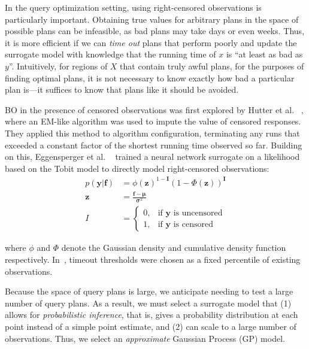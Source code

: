 In the query optimization setting, using right-censored observations is particularly important. Obtaining true values for arbitrary plans in the space of possible plans can be infeasible, as bad plans may take days or even weeks. Thus, it is more efficient if we can \emph{time out} plans that perform poorly and update the surrogate model with knowledge that the running time of $x$ is ``at least as bad as $y$''. Intuitively, for regions of $X$ that contain truly awful  plans, for the purposes of finding optimal plans, it is not necessary to know exactly how bad a particular plan is---it suffices to know that plans like it should be avoided. 

BO in the presence of censored observations was first explored by Hutter et al. ~\cite{DBLP:journals/corr/HutterHL13}, where an EM-like algorithm was used to impute the value of censored responses.
They applied this method to algorithm configuration, terminating any runs that exceeded a constant factor of the shortest running time observed so far. Building on this, Eggensperger et al. ~\cite{eggensperger2020neural} trained a neural network surrogate on a likelihood based on the Tobit model to directly model right-censored observations:
%
\begin{equation}
\begin{aligned}
\label{eq: tobit}
p(\mathbf{y}|\mathbf{f}) &= \phi(\mathbf{z})^{1-\mathbf{I}}(1-\Phi(\mathbf{z}))^\mathbf{I} \\
\mathbf{z} &= \frac{\mathbf{f}-\mathbf{\mu}}{\mathbf{\sigma}^2}\\ 
I&= \begin{cases}
       0, & \text{if } \mathbf{y} \text{ is uncensored} \\
       1, & \text{if } \mathbf{y} \text{ is censored}
    \end{cases}
\end{aligned}
\end{equation}
%

\noindent where $\phi$ and $\Phi$ denote the Gaussian density and cumulative density function respectively. In~\cite{eggensperger2020neural}, timeout thresholds were chosen as a fixed percentile of existing observations.

Because the space of query plans is large, we anticipate needing to test a large number of query plans. As a result, we must select a surrogate model that (1) allows for \emph{probabilistic inference}, that is, gives a probability distribution at each point instead of a simple point estimate, and (2) can scale to a large number of observations. Thus, we select an \emph{approximate} Gaussian Process (GP) model.

